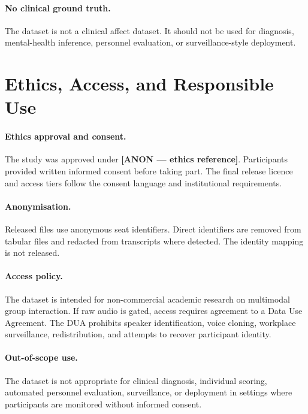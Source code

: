 \documentclass{article}
\begin{document}
\paragraph{No clinical ground truth.}
The dataset is not a clinical affect dataset.
It should not be used for diagnosis, mental-health inference, personnel
evaluation, or surveillance-style deployment.

\section{Ethics, Access, and Responsible Use}
\label{sec:ethics}

\paragraph{Ethics approval and consent.}
The study was approved under \textbf{[ANON --- ethics reference]}.
Participants provided written informed consent before taking part.
The final release licence and access tiers follow the consent language and
institutional requirements.

\paragraph{Anonymisation.}
Released files use anonymous seat identifiers.
Direct identifiers are removed from tabular files and redacted from transcripts
where detected.
The identity mapping is not released.

\paragraph{Access policy.}
The dataset is intended for non-commercial academic research on multimodal
group interaction.
If raw audio is gated, access requires agreement to a Data Use Agreement.
The DUA prohibits speaker identification, voice cloning, workplace
surveillance, redistribution, and attempts to recover participant identity.

\paragraph{Out-of-scope use.}
The dataset is not appropriate for clinical diagnosis, individual scoring,
automated personnel evaluation, surveillance, or deployment in settings where
participants are monitored without informed consent.
\end{document}
